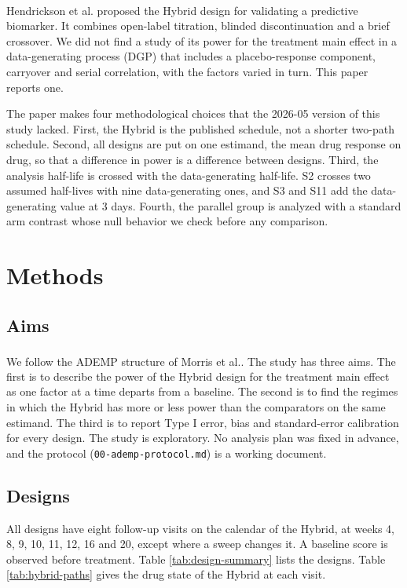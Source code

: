 \documentclass[
  11pt,
]{article}
\begin{document}
Hendrickson et al.\textsuperscript{} proposed the Hybrid design for validating a predictive biomarker. It combines open-label titration, blinded discontinuation and a brief crossover. We did not find a study of its power for the treatment main effect in a data-generating process (DGP) that includes a placebo-response component, carryover and serial correlation, with the factors varied in turn. This paper reports one.

The paper makes four methodological choices that the 2026-05 version of this study lacked. First, the Hybrid is the published schedule, not a shorter two-path schedule. Second, all designs are put on one estimand, the mean drug response on drug, so that a difference in power is a difference between designs. Third, the analysis half-life is crossed with the data-generating half-life. S2 crosses two assumed half-lives with nine data-generating ones, and S3 and S11 add the data-generating value at 3 days. Fourth, the parallel group is analyzed with a standard arm contrast whose null behavior we check before any comparison.

\section{Methods}\label{methods}

\subsection{Aims}\label{aims}

We follow the ADEMP structure of Morris et al.\textsuperscript{}. The study has three aims. The first is to describe the power of the Hybrid design for the treatment main effect as one factor at a time departs from a baseline. The second is to find the regimes in which the Hybrid has more or less power than the comparators on the same estimand. The third is to report Type I error, bias and standard-error calibration for every design. The study is exploratory. No analysis plan was fixed in advance, and the protocol (\texttt{00-ademp-protocol.md}) is a working document.

\subsection{Designs}\label{designs}

All designs have eight follow-up visits on the calendar of the Hybrid, at weeks 4, 8, 9, 10, 11, 12, 16 and 20, except where a sweep changes it. A baseline score is observed before treatment. Table \ref{tab:design-summary} lists the designs. Table \ref{tab:hybrid-paths} gives the drug state of the Hybrid at each visit.
\end{document}
